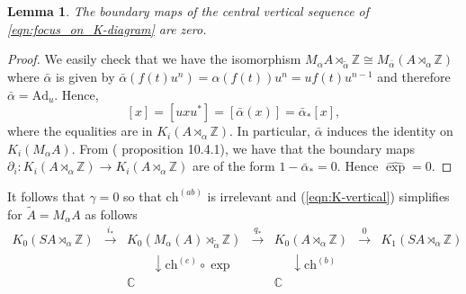 \documentclass[11pt]{amsart}
\newtheorem{lemma}{Lemma}[section]
\newcommand{\Z}{\mathbb{Z}}
\newcommand{\C}{\mathbb{C}}
\newcommand{\chb}{\text{ch}^{(b)}}
\newcommand{\che}{\text{ch}^{(e)}}
\newcommand{\chab}{\text{ch}^{(ab)}}
\begin{document}
\begin{lemma}\label{lem-split-exact}
	The boundary maps of the central vertical sequence of \eqref{eqn:focus_on_K-diagram} are zero. 
\end{lemma}
\begin{proof}
	We easily check that we have the isomorphism $M_\alpha A \rtimes_{\tilde{\alpha}} \mathbb{Z}\cong M_{\bar{\alpha}}(A \rtimes_\alpha \mathbb{Z}) $ where $\bar{\alpha}$ is given by $\bar{\alpha}(f(t) u^n)=\alpha(f(t))u^n= u f(t) u^{n-1} $ and therefore $\bar{\alpha}=\mathrm{Ad}_u$. Hence,
	$$[x]=[uxu^*]=[\bar{\alpha}(x)]=\bar{\alpha}_*[x],$$
	where the equalities are in $K_i(A \rtimes_\alpha \mathbb{Z})$. In particular, $\bar\alpha$ induces the identity on $K_i(M_\alpha A)$. From  (\cite{blackadar1998k} proposition 10.4.1), we have that the boundary maps $\partial_i:K_i(A\rtimes_\alpha \Z) \rightarrow K_i(A\rtimes_\alpha \Z)$ are of the form $1-\bar{\alpha}_*=0$. Hence $\hat{\exp}=0$. 
\end{proof}

It follows that $\gamma=0$ so that $\chab$ is irrelevant and (\ref{eqn:K-vertical}) simplifies for $\tilde A = M_\alpha A$ as follows 
\begin{equation}\label{eqn:K-vertical_mappingTorus}
\begin{matrix}
K_0(SA \rtimes_\alpha \mathbb{Z}) & \stackrel{i_*}\to &
 K_0(M_{\alpha}(A) \rtimes_{\tilde\alpha} \mathbb{Z}) &  \stackrel{q_*}\to &
K_0(A \rtimes_\alpha \mathbb{Z}) &  \stackrel{0}\to & 
K_1(SA \rtimes_\alpha \mathbb{Z})\\
 & &\:\:\:\:\:\:\:\:\: \downarrow \che\!\circ\exp & &\:\:\:\:\:\: \downarrow \chb & &  \\
 & &\!\!\!\!\!\!\!\!\!\!\!\!\!\!\!\!\!\!\!\!\!\C  & & \!\!\!\!\!\!\!\!\!\!\!\!\!\C  & & 
 \end{matrix}
\end{equation}
\end{document}

